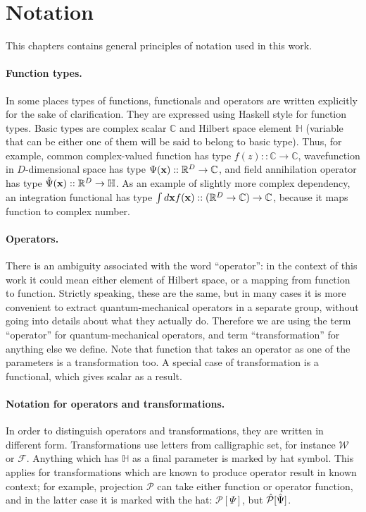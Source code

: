 \section{Notation}

This chapters contains general principles of notation used in this work.

\paragraph{Function types.}
In some places types of functions, functionals and operators are written explicitly for the sake of clarification.
They are expressed using Haskell style for function types.
Basic types are complex scalar $\mathbb{C}$ and Hilbert space element $\mathbb{H}$ (variable that can be either one of them will be said to belong to basic type).
Thus, for example, common complex-valued function has type $f(z) :: \mathbb{C} \rightarrow \mathbb{C}$,
wavefunction in $D$-dimensional space has type $\Psi(\mathbf{x}) :: \mathbb{R}^D \rightarrow \mathbb{C}$,
and field annihilation operator has type $\hat{\Psi}(\mathbf{x}) :: \mathbb{R}^D \rightarrow \mathbb{H}$.
As an example of slightly more complex dependency,
an integration functional has type $\int d\mathbf{x} f(\mathbf{x}) :: (\mathbb{R}^D \rightarrow \mathbb{C}) \rightarrow \mathbb{C}$,
because it maps function to complex number.

\paragraph{Operators.}
There is an ambiguity associated with the word ``operator'':
in the context of this work it could mean either element of Hilbert space, or a mapping from function to function.
Strictly speaking, these are the same, but in many cases it is more convenient to extract quantum-mechanical operators in a separate group, without going into details about what they actually do.
Therefore we are using the term ``operator'' for quantum-mechanical operators,
and term ``transformation'' for anything else we define.
Note that function that takes an operator as one of the parameters is a transformation too.
A special case of transformation is a functional, which gives scalar as a result.

\paragraph{Notation for operators and transformations.}
In order to distinguish operators and transformations, they are written in different form.
Transformations use letters from calligraphic set, for instance $\mathcal{W}$ or $\mathcal{F}$.
Anything which has $\mathbb{H}$ as a final parameter is marked by hat symbol.
This applies for transformations which are known to produce operator result in known context;
for example, projection $\mathcal{P}$ can take either function or operator function,
and in the latter case it is marked with the hat: $\mathcal{P}[\Psi]$, but $\hat{\mathcal{P}}[\hat{\Psi}]$.

